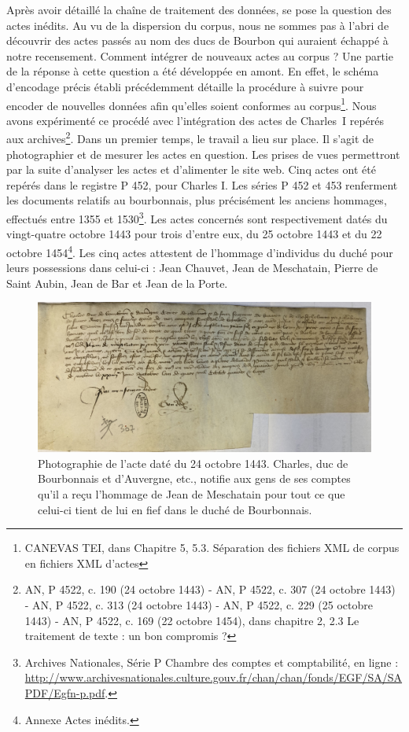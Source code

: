 \par Après avoir détaillé la chaîne de traitement des données, se pose la question des actes inédits. Au vu de la dispersion du corpus, nous ne sommes pas à l'abri de découvrir des actes passés au nom des ducs de Bourbon qui auraient échappé à notre recensement. Comment intégrer de nouveaux actes au corpus ? Une partie de la réponse à cette question a été développée en amont. En effet, le schéma d'encodage précis établi précédemment détaille la procédure à suivre pour encoder de nouvelles données afin qu'elles soient conformes au corpus\footnote{CANEVAS TEI, dans Chapitre 5, 5.3. Séparation des fichiers XML de corpus en fichiers XML d’actes}. Nous avons expérimenté ce procédé avec l'intégration des actes de Charles~I repérés aux archives\footnote{AN, P 4522, c. 190 (24 octobre 1443) - AN, P 4522, c. 307 (24 octobre 1443) - AN, P 4522, c. 313 (24 octobre 1443) - AN, P 4522, c. 229 (25 octobre 1443) - AN, P 4522, c. 169 (22 octobre 1454), dans chapitre 2, 2.3 Le traitement de texte : un bon compromis ?}. Dans un premier temps, le travail a lieu sur place. Il s'agit de photographier et de mesurer les actes en question. Les prises de vues permettront par la suite d'analyser les actes et d'alimenter le site web. Cinq actes ont été repérés dans le registre P 452, pour Charles I. Les séries P 452 et 453 renferment les documents relatifs au bourbonnais, plus précisément les anciens hommages, effectués entre 1355 et 1530\footnote{Archives Nationales, \og Série P Chambre des comptes et comptabilité\fg, en ligne : \url{http://www.archivesnationales.culture.gouv.fr/chan/chan/fonds/EGF/SA/SAPDF/Egfn-p.pdf}.}. Les actes concernés sont respectivement datés du vingt-quatre octobre 1443 pour trois d'entre eux, du 25 octobre 1443 et du 22 octobre 1454\footnote{Annexe Actes inédits.}. Les cinq actes attestent de l'hommage d'individus du duché pour leurs possessions dans celui-ci : Jean Chauvet, Jean de Meschatain, Pierre de Saint Aubin, Jean de Bar et Jean de la Porte. 
\newpage 

\begin{figure}[H]
    \centering
    \includegraphics[scale=0.115]{front/images/1443_10_24b.jpg}
    \caption{Photographie de l'acte daté du 24 octobre 1443. \newline Charles, duc de Bourbonnais et d'Auvergne, etc., notifie aux gens de ses comptes qu'il a reçu l'hommage de Jean de Meschatain pour tout ce que celui-ci tient de lui en fief dans le duché de Bourbonnais.}
    \label{fig:1443_10_24b}
\end{figure} 

